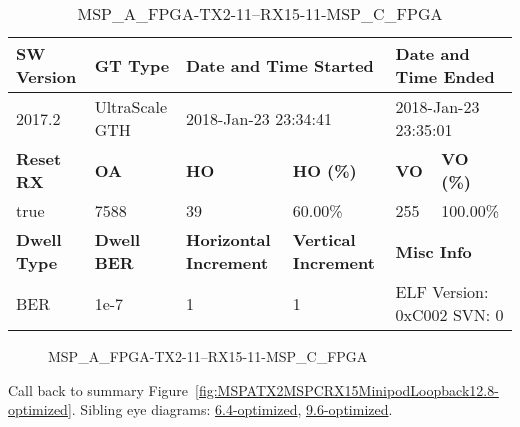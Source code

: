 \begin{table}[h]
\centering
\caption{MSP\_A\_FPGA-TX2-11--RX15-11-MSP\_C\_FPGA}
\label{tab:MSPAFPGATX211RX1511MSPCFPGA12.8-optimized}
\begin{tabular}{@{}|l|l|l|l|l|l|@{}}
\toprule
\textbf{SW Version}                & \textbf{GT Type}   & \multicolumn{2}{l|}{\textbf{Date and Time Started}}            & \multicolumn{2}{l|}{\textbf{Date and Time Ended}}        \\ \midrule
2017.2                       & UltraScale GTH          & \multicolumn{2}{l|}{2018-Jan-23 23:34:41}                   & \multicolumn{2}{l|}{2018-Jan-23 23:35:01}               \\ \midrule
\textbf{Reset RX}                  & \textbf{OA} & \textbf{HO}   & \textbf{HO (\%)} & \textbf{VO} & \textbf{VO (\%)} \\ \midrule
true & 7588        & 39          & 60.00\%        & 255        & 100.00\%       \\ \midrule
\textbf{Dwell Type}                & \textbf{Dwell BER} & \textbf{Horizontal Increment} & \textbf{Vertical Increment}    & \multicolumn{2}{l|}{\textbf{Misc Info}}                  \\ \midrule
BER                            & 1e-7        & 1        & 1           & \multicolumn{2}{l|}{ELF Version: 0xC002 SVN: 0}                         \\ \bottomrule
\end{tabular}
\end{table}

\begin{figure}[h]
\caption{MSP\_A\_FPGA-TX2-11--RX15-11-MSP\_C\_FPGA} \label{fig:MSPAFPGATX211RX1511MSPCFPGA12.8-optimized}
\end{figure}

Call back to summary Figure~\ref{fig:MSPATX2MSPCRX15MinipodLoopback12.8-optimized}.
Sibling eye diagrams: \hyperref[sec:MSPAFPGATX211RX1511MSPCFPGA6.4-optimized]{6.4-optimized}, \hyperref[sec:MSPAFPGATX211RX1511MSPCFPGA9.6-optimized]{9.6-optimized}.

\clearpage
\newpage

